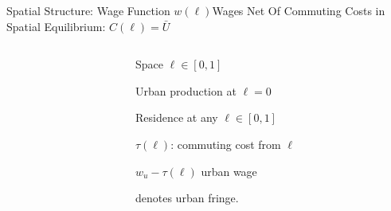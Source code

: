\documentclass[aspectratio=169]{beamer}
\begin{document}

\begin{frame}{Spatial Structure: Wage Function $w(\ell)$}{Wages Net Of Commuting Costs in Spatial Equilibrium: $C(\ell) = \bar{U}$}
\begin{columns}
\begin{column}{0.7\textwidth}

\end{column}
\begin{column}{0.3\textwidth}
\begin{mide}
\item<1-> Space $\ell \in[0,1]$
\item<2-> Urban production at $\ell=0$
\item<2-> Residence at any $\ell \in[0,1]$
\item<3-> $\tau(\ell)$: commuting cost from $\ell$
\item<3-> $w_u - \tau(\ell)$ urban wage
\item<4-> {\color{red}{$\phi$}} denotes urban fringe.
\end{mide}
\end{column}
\end{columns}
\end{frame}


% 			
				
\end{document}
